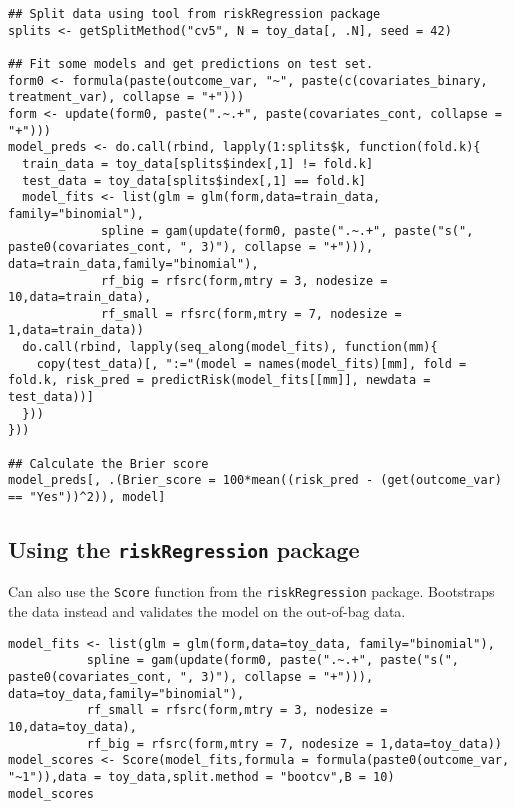 \documentclass[a4paper,danish]{article}
\begin{document}
\lstset{language=r,label= ,caption= ,captionpos=b,numbers=none}
\begin{lstlisting}
## Split data using tool from riskRegression package
splits <- getSplitMethod("cv5", N = toy_data[, .N], seed = 42)

## Fit some models and get predictions on test set.
form0 <- formula(paste(outcome_var, "~", paste(c(covariates_binary, treatment_var), collapse = "+")))
form <- update(form0, paste(".~.+", paste(covariates_cont, collapse = "+")))
model_preds <- do.call(rbind, lapply(1:splits$k, function(fold.k){
  train_data = toy_data[splits$index[,1] != fold.k]
  test_data = toy_data[splits$index[,1] == fold.k]
  model_fits <- list(glm = glm(form,data=train_data, family="binomial"),
		     spline = gam(update(form0, paste(".~.+", paste("s(", paste0(covariates_cont, ", 3)"), collapse = "+"))), data=train_data,family="binomial"),
		     rf_big = rfsrc(form,mtry = 3, nodesize = 10,data=train_data),
		     rf_small = rfsrc(form,mtry = 7, nodesize = 1,data=train_data))
  do.call(rbind, lapply(seq_along(model_fits), function(mm){
    copy(test_data)[, ":="(model = names(model_fits)[mm], fold = fold.k, risk_pred = predictRisk(model_fits[[mm]], newdata = test_data))]
  }))
}))

## Calculate the Brier score
model_preds[, .(Brier_score = 100*mean((risk_pred - (get(outcome_var) == "Yes"))^2)), model]
\end{lstlisting}

\subsection{Using the \texttt{riskRegression} package}
\label{sec:org79d6148}
Can also use the \texttt{Score} function from the \texttt{riskRegression} package. Bootstraps the data instead and
validates the model on the out-of-bag data. 

\lstset{language=r,label= ,caption= ,captionpos=b,numbers=none}
\begin{lstlisting}
model_fits <- list(glm = glm(form,data=toy_data, family="binomial"),
		   spline = gam(update(form0, paste(".~.+", paste("s(", paste0(covariates_cont, ", 3)"), collapse = "+"))), data=toy_data,family="binomial"),
		   rf_small = rfsrc(form,mtry = 3, nodesize = 10,data=toy_data),
		   rf_big = rfsrc(form,mtry = 7, nodesize = 1,data=toy_data))
model_scores <- Score(model_fits,formula = formula(paste0(outcome_var, "~1")),data = toy_data,split.method = "bootcv",B = 10)
model_scores
\end{lstlisting}
\end{document}
